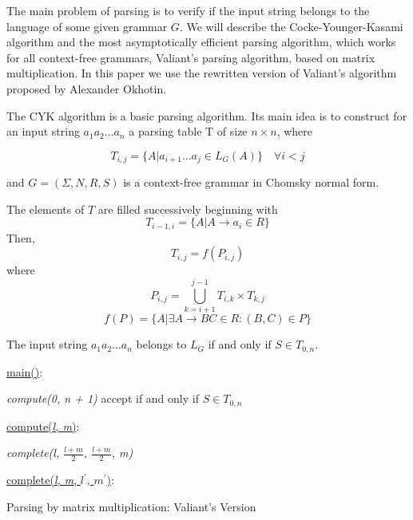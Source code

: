 The main problem of parsing is to verify if the input string belongs to the language of some given grammar $G$. We will describe the Cocke-Younger-Kasami algorithm and the most asymptotically efficient parsing algorithm, which works for all context-free grammars, Valiant's parsing algorithm, based on matrix multiplication. In this paper we use the rewritten version of Valiant's algorithm proposed by Alexander Okhotin.

The CYK algorithm is a basic parsing algorithm. Its main idea is to construct for an input string $a_{1}a_{2} \dots a_{n}$ a parsing table T of size $n \times n$,  where

$$T_{i, j} =  \{ A |  a_{i + 1} \dots a_{j} \in L_{G}(A)\} \quad \forall i < j$$

and $G = (\Sigma, N, R, S)$ is a context-free grammar in Chomsky normal form.

The elements of $T$ are filled successively beginning with
$$ T_{i - 1, i} = \{ A | A \rightarrow a_{i} \in R\}$$
Then,
$$ T_{i, j} = f(P_{i, j})$$
where
$$ P_{i, j} = \bigcup\limits_{k = i + 1}^{j - 1} T_{i,k} \times T_{k, j}  $$
$$ f(P) = \{A | \exists A \rightarrow BC \in R : (B, C) \in P\} $$

The input string $a_{1}a_{2} \dots a_{n}$ belongs to $L_{G}$ if and only if $S \in T_{0, n}$.

\begin{algorithm}
\SetAlgoNoLine
{}
\underline{main()}{:}{

 \textit{compute(0, n + 1)\;}
 accept if and only if $S \in T_{0, n}$
 \linebreak
 }

\underline{compute(\textit{l, m})}{:}{

 \textit{complete(l, $\frac{l+m}{2}$, $\frac{l+m}{2}$, m)}
 \linebreak
 }

\underline{complete(\textit{l, m}, $l^\prime$, $m^\prime$)}{:}{

 }
\caption{Parsing by matrix multiplication: Valiant's Version}
\end{algorithm}

